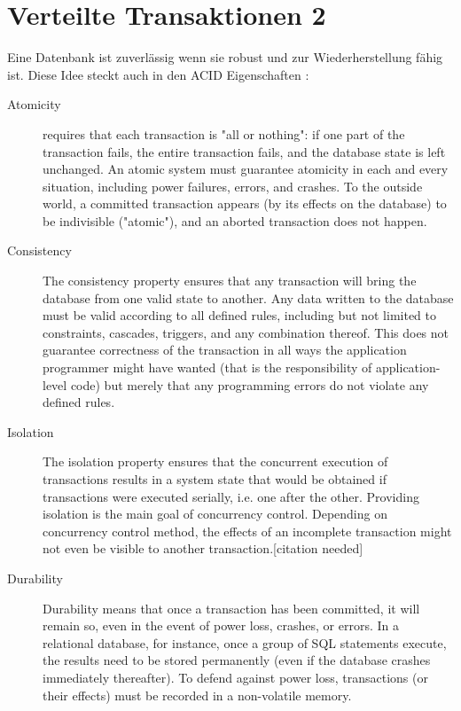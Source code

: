 \documentclass[a4paper,10pt,titlepage=false]{scrreprt}
\begin{document}
\chapter{Verteilte Transaktionen 2} %
\label{cha:verteilte_transaktionen_2}

Eine Datenbank ist zuverlässig wenn sie robust und zur Wiederherstellung fähig ist.
Diese Idee steckt auch in den ACID Eigenschaften :
\begin{description}
  \item[Atomicity] requires that each transaction is "all or nothing": if one part of the transaction fails, the entire transaction fails, and the database state is left unchanged. An atomic system must guarantee atomicity in each and every situation, including power failures, errors, and crashes. To the outside world, a committed transaction appears (by its effects on the database) to be indivisible ("atomic"), and an aborted transaction does not happen.

\item[Consistency] The consistency property ensures that any transaction will bring the database from one valid state to another. Any data written to the database must be valid according to all defined rules, including but not limited to constraints, cascades, triggers, and any combination thereof. This does not guarantee correctness of the transaction in all ways the application programmer might have wanted (that is the responsibility of application-level code) but merely that any programming errors do not violate any defined rules.

\item[Isolation]The isolation property ensures that the concurrent execution of transactions results in a system state that would be obtained if transactions were executed serially, i.e. one after the other. Providing isolation is the main goal of concurrency control. Depending on concurrency control method, the effects of an incomplete transaction might not even be visible to another transaction.[citation needed]

\item[Durability] Durability means that once a transaction has been committed, it will remain so, even in the event of power loss, crashes, or errors. In a relational database, for instance, once a group of SQL statements execute, the results need to be stored permanently (even if the database crashes immediately thereafter). To defend against power loss, transactions (or their effects) must be recorded in a non-volatile memory.
\end{description}
\end{document}
